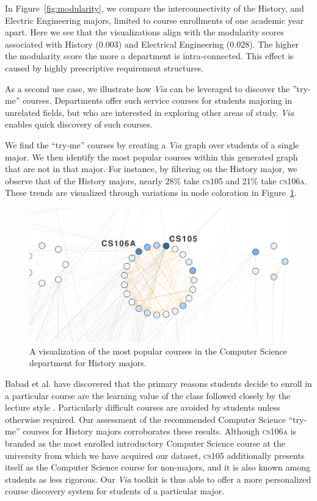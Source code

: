 In Figure~\ref{fig:modularity}, we compare the interconnectivity of
the History, and Electric Engineering majors, limited to course
enrollments of one academic year apart.  Here we see that the
visualizations align with the modularity scores associated with
History (0.003) and Electrical Engineering (0.028). The higher the
modularity score the more a department is intra-connected. This effect
is caused by highly prescriptive requirement structures.

As a second use case, we illustrate how \textit{Via} can be leveraged
to discover the ''try-me'' courses. Departments offer such service courses for students
majoring in unrelated fields, but who are interested in exploring other
areas of study. {\em Via} enables quick discovery of such courses.

We find the ``try-me'' courses by creating a {\em Via} graph over
students of a single major. We then identify the most popular courses
within this generated graph that are not in that major. For instance,
by filtering on the History major, we observe that of the History
majors, nearly 28\% take \textsc{cs105} and 21\% take
\textsc{cs106a}. These trends are visualized through variations in
node coloration in Figure~\ref{fig:history-try-me}.

\begin{figure}[h]
    \centering
    \includegraphics[width=.9\columnwidth]{Figs/final-history-try-me.pdf}
    \caption{A visualization of the most popular courses in the Computer Science department for History majors.}
    \label{fig:history-try-me}
\end{figure}

 Babad et al. have discovered that the primary reasons students decide
 to enroll in a particular course are the learning value of the class
 followed closely by the lecture style \cite{Babad2003}. Particularly
 difficult courses are avoided by students unless otherwise
 required. Our assessment of the recommended Computer Science
 ``try-me'' courses for History majors corroborates these
 results. Although \textsc{cs106a} is branded as the most enrolled
 introductory Computer Science course at the university from which we
 have acquired our dataset, \textsc{cs105} additionally presents
 itself as the Computer Science course for non-majors, and it is also
 known among students as less rigorous. Our \textit{Via} toolkit is
 thus able to offer a more personalized course discovery system for
 students of a particular major.
 
